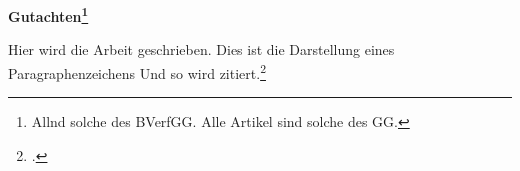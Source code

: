 \documentclass[widefront]{jura}
\begin{document}





\mainmatter


\boldmath


\renewcommand{\thefootnote}{\fnsymbol{footnote}}
{\noindent\large\bfseries
Gutachten\footnote{Allnd solche des BVerfGG. Alle Artikel sind solche des GG.}
}
\renewcommand{\thefootnote}{\arabic{footnote}}\addtocounter{footnote}{-1}

\normalsize \mdseries


\levelup
\levelup
\levelup
\levelup
\levelup
\levelup
\levelup
\levelup 
{}


Hier wird die Arbeit geschrieben. Dies ist die Darstellung eines
Paragraphenzeichens
Und so wird zitiert.\footcite[Lackner][\S~123~Rn.~12]{lackner}
\end{document}
